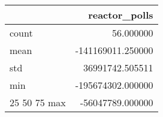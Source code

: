 \begin{tabular}{lr}
\toprule
 & reactor\_polls \\
\midrule
count & 56.000000 \\
mean & -141169011.250000 \\
std & 36991742.505511 \\
min & -195674302.000000 \\
25%
50%
75%
max & -56047789.000000 \\
\bottomrule
\end{tabular}

